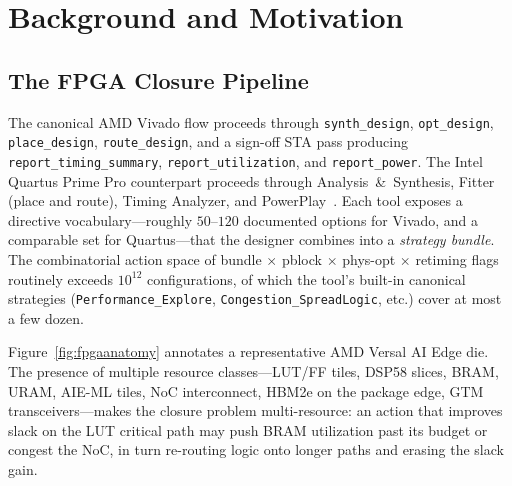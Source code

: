 \documentclass[journal,onecolumn=false]{IEEEtran}
\begin{document}
\section{Background and Motivation}
\label{sec:background}

\subsection{The FPGA Closure Pipeline}
The canonical AMD Vivado flow proceeds through \texttt{synth\_design}, \texttt{opt\_design}, \texttt{place\_design}, \texttt{route\_design}, and a sign-off STA pass producing \texttt{report\_timing\_summary}, \texttt{report\_utilization}, and \texttt{report\_power}. The Intel Quartus Prime Pro counterpart proceeds through Analysis~\&~Synthesis, Fitter (place and route), Timing Analyzer, and PowerPlay~\cite{intel_ug20156}. Each tool exposes a directive vocabulary---roughly $50$--$120$ documented options for Vivado, and a comparable set for Quartus---that the designer combines into a \emph{strategy bundle}. The combinatorial action space of bundle$\,\times\,$pblock$\,\times\,$phys-opt$\,\times\,$retiming flags routinely exceeds $10^{12}$ configurations, of which the tool's built-in canonical strategies (\texttt{Performance\_Explore}, \texttt{Congestion\_SpreadLogic}, etc.) cover at most a few dozen.

Figure~\ref{fig:fpgaanatomy} annotates a representative AMD Versal AI Edge die. The presence of multiple resource classes---LUT/FF tiles, DSP58 slices, BRAM, URAM, AIE-ML tiles, NoC interconnect, HBM2e on the package edge, GTM transceivers---makes the closure problem multi-resource: an action that improves slack on the LUT critical path may push BRAM utilization past its budget or congest the NoC, in turn re-routing logic onto longer paths and erasing the slack gain.
\end{document}

